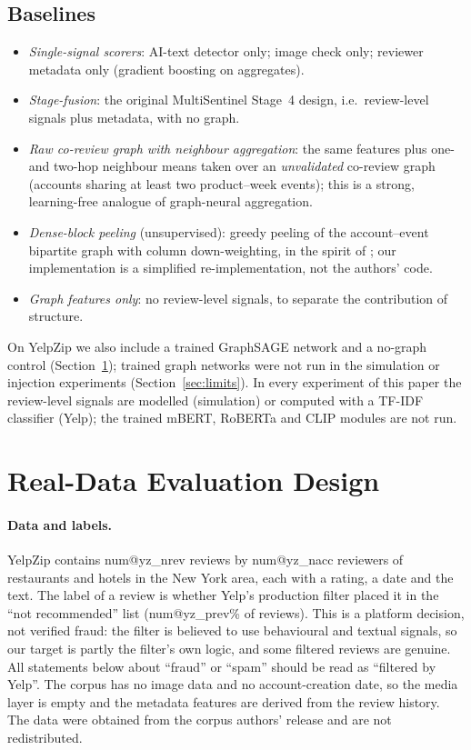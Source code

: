 \documentclass[pdflatex,sn-basic]{sn-jnl}
\makeatletter
\theoremstyle{thmstyleone}
\theoremstyle{thmstylethree}
\newcommand{\num}[1]{\csname num@#1\endcsname}
\makeatother
\begin{document}
\subsection{Baselines}
\begin{itemize}
\item \emph{Single-signal scorers}: AI-text detector only; image check only; reviewer metadata only (gradient boosting on aggregates).
\item \emph{Stage-fusion}: the original MultiSentinel Stage~4 design, i.e.\ review-level signals plus metadata, with no graph.
\item \emph{Raw co-review graph with neighbour aggregation}: the same features plus one- and two-hop neighbour means taken over an \emph{unvalidated} co-review graph (accounts sharing at least two product--week events); this is a strong, learning-free analogue of graph-neural aggregation.
\item \emph{Dense-block peeling} (unsupervised): greedy peeling of the account--event bipartite graph with column down-weighting, in the spirit of \citet{hooi2016}; our implementation is a simplified re-implementation, not the authors' code.
\item \emph{Graph features only}: no review-level signals, to separate the contribution of structure.
\end{itemize}
On YelpZip we also include a trained GraphSAGE network and a no-graph control (Section~\ref{sec:real_design}); trained graph networks were not run in the simulation or injection experiments (Section~\ref{sec:limits}). In every experiment of this paper the review-level signals are modelled (simulation) or computed with a TF-IDF classifier (Yelp); the trained mBERT, RoBERTa and CLIP modules are not run.

\section{Real-Data Evaluation Design}\label{sec:real_design}

\paragraph{Data and labels.} YelpZip \citep{rayana2015} contains \num{yz_nrev} reviews by \num{yz_nacc} reviewers of restaurants and hotels in the New York area, each with a rating, a date and the text. The label of a review is whether Yelp's production filter placed it in the ``not recommended'' list (\num{yz_prev}\% of reviews). This is a platform decision, not verified fraud: the filter is believed to use behavioural and textual signals, so our target is partly the filter's own logic, and some filtered reviews are genuine. All statements below about ``fraud'' or ``spam'' should be read as ``filtered by Yelp''. The corpus has no image data and no account-creation date, so the media layer is empty and the metadata features are derived from the review history. The data were obtained from the corpus authors' release and are not redistributed.
\end{document}
